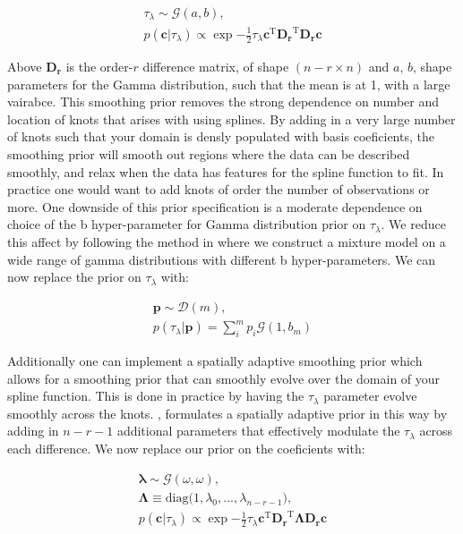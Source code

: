 \begin{eqnarray}
\tau_\lambda \sim \mathcal{G}(a, b), \\
p(\bm{c} | \tau_\lambda) \propto \exp{-\frac{1}{2} \tau_\lambda \bm{c}^{\mathrm{T}} \bm{D_r}^{\mathrm{T}} \bm{D_r} \bm{c}}
\end{eqnarray}

\noindent Above $\bm{D_r}$ is the order-$r$ difference matrix, of shape $(n-r \times n)$ and $a$, $b$, shape parameters for the Gamma distribution, such that
the mean is at 1, with a large vairabce. This smoothing prior removes the strong dependence on number and location of knots that arises with using splines. 
By adding in a very large number of knots such that your domain is densly populated with basis coeficients, the smoothing prior will smooth out regions where 
the data can be described smoothly, and relax when the data has features for the spline function to fit. In practice one would want to add knots 
of order the number of observations or more. One downside of this prior specification is a moderate dependence on choice of the b hyper-parameter for 
Gamma distribution prior on $\tau_\lambda$. We reduce this affect by following the method in  where we construct 
a mixture model on a wide range of gamma distributions with different b hyper-parameters. We can now replace the prior on $\tau_\lambda$ with:

\begin{eqnarray}
\bm{p} \sim \mathcal{D}(m), \\
p(\tau_\lambda | \bm{p}) = \sum_i^m p_i \mathcal{G}(1, b_m)
\end{eqnarray}

Additionally one can implement a spatially adaptive smoothing prior which allows for a smoothing prior
that can smoothly evolve over the domain of your spline function. This is done in practice by having the $\tau_\lambda$ parameter evolve smoothly
across the knots. , formulates a spatially adaptive prior in this way by adding in $n-r-1$ additional parameters that
effectively modulate the $\tau_\lambda$ across each difference. We now replace our prior on the coeficients with:

\begin{eqnarray}
\bm{\lambda} \sim \mathcal{G}(\omega, \omega), \\
\bm{\Lambda} \equiv \mathrm{diag}\big(1, \lambda_0,...,\lambda_{n-r-1}\big), \\
p(\bm{c} | \tau_\lambda) \propto \exp{-\frac{1}{2} \tau_\lambda \bm{c}^{\mathrm{T}} \bm{D_r}^{\mathrm{T}} \bm{\Lambda} \bm{D_r} \bm{c}}
\end{eqnarray}

